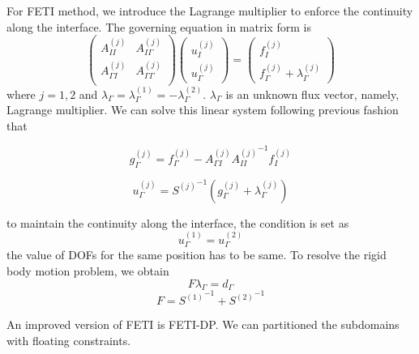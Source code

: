 For FETI method, we introduce the Lagrange multiplier to enforce the continuity along the interface. The governing equation in matrix form is 
\begin{equation}
\begin{pmatrix}
A_{II}^{(j)} & A_{I \Gamma}^{(j)} \\
A_{\Gamma I}^{(j)} & A_{\Gamma \Gamma}^{(j)} \\
\end{pmatrix} \begin{pmatrix}
u_{I}^{(j)} \\ u_{\Gamma}^{(j)} 
\end{pmatrix} = \begin{pmatrix}
f_{I}^{(j)} \\ f_{\Gamma}^{(j)} + \lambda_{\Gamma}^{(j)}
\end{pmatrix}
\end{equation}
where $ j = 1, 2 $ and $ \lambda_{\Gamma} = \lambda_{\Gamma}^{(1)} = - \lambda_{\Gamma}^{(2)} $. $ \lambda_{\Gamma} $ is an unknown flux vector, namely, Lagrange multiplier. We can solve this linear system following previous fashion that

\begin{equation}
g_{\Gamma}^{(j)} = f_{\Gamma}^{(j)} - A_{\Gamma I}^{(j)} {A_{II}^{(j)}}^{-1} f_{I}^{(j)}
\end{equation}

\begin{equation}
u_{\Gamma}^{(j)} = {S^{(j)}}^{-1} (g_{\Gamma}^{(j)} + \lambda_{\Gamma}^{(j)})
\end{equation}

to maintain the continuity along the interface, the condition is set as
\begin{equation}
u_{\Gamma}^{(1)} = u_{\Gamma}^{(2)}
\end{equation}
the value of DOFs for the same position has to be same. To resolve the rigid body motion problem, we obtain
\begin{equation}
F \lambda_{\Gamma} = d_{\Gamma}
\end{equation}
\begin{equation}
F = {S^{(1)}}^{-1} + {S^{(2)}}^{-1}
\end{equation}

An improved version of FETI is FETI-DP. We can partitioned the subdomains with floating constraints.

